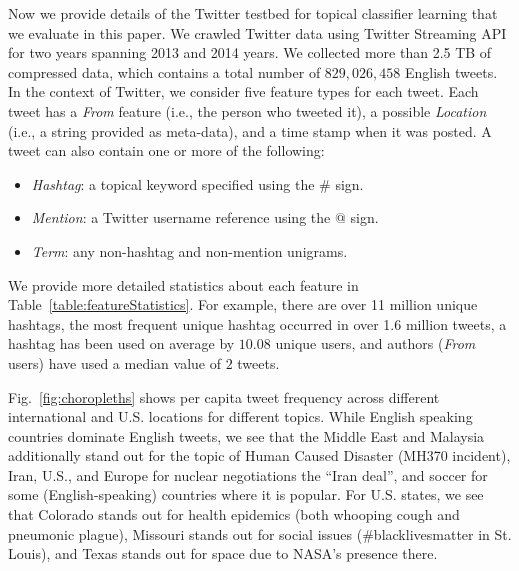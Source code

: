
Now we provide details of the Twitter testbed for topical classifier learning
that we evaluate in this paper.  We crawled Twitter data using Twitter
Streaming API for two years spanning 2013 and 2014 years.
We collected more than 2.5 TB of compressed data, which contains a total number 
of $829,026,458$ English tweets. In the context 
of Twitter, we consider five feature types for each tweet.  Each
tweet has a \textit{From} feature (i.e., the person who tweeted it), a
possible \textit{Location} (i.e., a string provided as meta-data), and
a time stamp when it was posted.  A tweet can also contain one or more
of the following:
\begin{itemize}
\item \textit{Hashtag}: a topical keyword specified using the \# sign.
\item \textit{Mention}: a Twitter username reference using the @ sign. %
\item \textit{Term}:    any non-hashtag and non-mention unigrams. %
\end{itemize}
We provide more detailed statistics about each feature in
Table~\ref{table:featureStatistics}.  For example, there are
over 11 million unique hashtags, the most frequent unique hashtag
occurred in over 1.6 million tweets,
a hashtag has been used on average by $10.08$ unique users, and 
authors (\textit{From} users) have used a median value of $2$
tweets. %

Fig.~\ref{fig:choropleths} shows per capita tweet frequency across
different international and U.S. locations for different topics.
While English speaking countries dominate English tweets, we see that
the Middle East and Malaysia additionally stand out for the topic of
Human Caused Disaster (MH370 incident), Iran, U.S., and Europe for nuclear
negotiations the ``Iran deal'', and soccer for some (English-speaking)
countries where it is popular.  For U.S. states, we see that Colorado
stands out for health epidemics (both whooping cough and pneumonic
plague), Missouri stands out for social issues (\#blacklivesmatter in
St. Louis), and Texas stands out for space due to NASA's presence
there.
